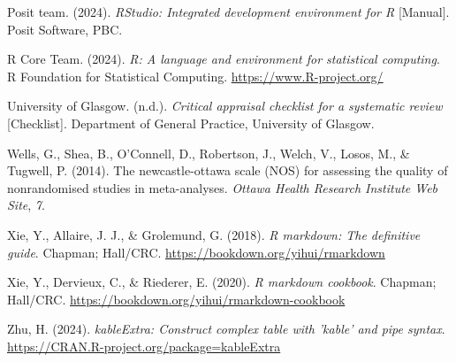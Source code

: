 \documentclass[
  stu]{apa7}
\newlength{\cslhangindent}
\newenvironment{CSLReferences}[2] %
 {\begin{list}{}{%
  \setlength{\itemindent}{0pt}
  \setlength{\leftmargin}{0pt}
  \setlength{\parsep}{0pt}
  \ifodd #1
   \setlength{\leftmargin}{\cslhangindent}
   \setlength{\itemindent}{-1\cslhangindent}
  \fi
  \setlength{\itemsep}{#2\baselineskip}}}
 {\end{list}}
\begin{document}
\begin{CSLReferences}{1}{0}
Posit team. (2024). \emph{{RStudio}: {Integrated} development environment for {R}} {[}Manual{]}. Posit Software, PBC.

R Core Team. (2024). \emph{R: A language and environment for statistical computing}. R Foundation for Statistical Computing. \url{https://www.R-project.org/}

University of Glasgow. (n.d.). \emph{Critical appraisal checklist for a systematic review} {[}Checklist{]}. Department of General Practice, University of Glasgow.

Wells, G., Shea, B., O'Connell, D., Robertson, J., Welch, V., Losos, M., \& Tugwell, P. (2014). The newcastle-ottawa scale ({NOS}) for assessing the quality of nonrandomised studies in meta-analyses. \emph{Ottawa Health Research Institute Web Site}, \emph{7}.

Xie, Y., Allaire, J. J., \& Grolemund, G. (2018). \emph{R markdown: The definitive guide}. Chapman; Hall/CRC. \url{https://bookdown.org/yihui/rmarkdown}

Xie, Y., Dervieux, C., \& Riederer, E. (2020). \emph{R markdown cookbook}. Chapman; Hall/CRC. \url{https://bookdown.org/yihui/rmarkdown-cookbook}

Zhu, H. (2024). \emph{kableExtra: Construct complex table with 'kable' and pipe syntax}. \url{https://CRAN.R-project.org/package=kableExtra}

\end{CSLReferences}


\clearpage
\renewcommand{\listfigurename}{Figure captions}

\clearpage
\renewcommand{\listtablename}{Table captions}
\end{document}
